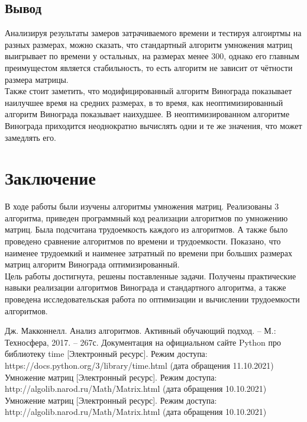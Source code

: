 \documentclass[12pt,a4paper]{report}
\begin{document}
\section{Вывод}

Анализируя результаты замеров затрачиваемого времени и тестируя алгоиртмы на разных размерах, 
можно сказать, что стандартный алгоритм умножения матриц выигрывает по времени у остальных, на 
размерах менее 300, однако его главным преимущестом является стабильность, то есть алгоритм не зависит от чётности 
размера матрицы. \\

Также стоит заметить, что модифицированный алгоритм Винограда показывает наилучшее время на средних размерах, в то 
время, как неоптимизированный алгоритм Винограда показывает наихудшее. 
В неоптимизированном алгоритме Винограда приходится неоднократно вычислять одни и те же значения, что может замедлять 
его.

\newpage
\chapter*{Заключение}

В ходе работы были изучены алгоритмы умножения матриц. 
Реализованы 3 алгоритма, приведен программный код реализации алгоритмов по умножению матриц.
Была подсчитана трудоемкость каждого из алгоритмов. 
А также было проведено сравнение алгоритмов по времени и трудоемкости. Показано, что наименее трудоемкий и наименее затратный по времени при больших размерах матриц алгоритм Винограда оптимизированный.\\

Цель работы достигнута, решены поставленные задачи.
Получены практические навыки реализации алгоритмов Винограда и стандартного алгоритма, а также проведена 
исследовательская работа по оптимизации и вычислении трудоемкости алгоритмов.

\newpage
\renewcommand\bibname{Список литературы}
\begin{thebibliography}{4}
     Дж. Макконнелл. Анализ алгоритмов. Активный обучающий подход. -- М.: Техносфера, 2017. -- 267с.
     Документация на официальном сайте Python про библиотеку time [Электронный ресурс]. Режим доступа: https://docs.python.org/3/library/time.html (дата обращения 11.10.2021)
     Умножение матриц [Электронный ресурс]. Режим доступа: http://algolib.narod.ru/Math/Matrix.html (дата обращения 10.10.2021)
     Умножение матриц [Электронный ресурс]. Режим доступа: http://algolib.narod.ru/Math/Matrix.html (дата обращения 10.10.2021)
\end{thebibliography}
\end{document}
